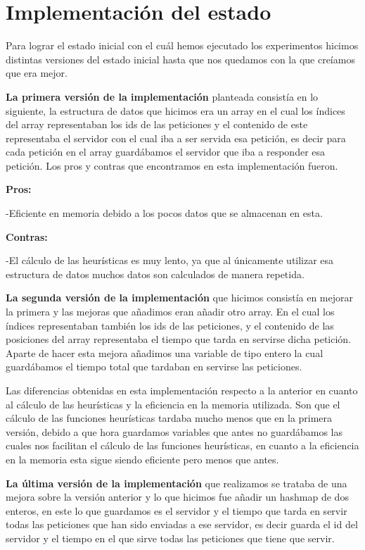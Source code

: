 \section{Implementación del estado}
Para lograr el estado inicial con el cuál hemos ejecutado los experimentos hicimos distintas versiones del estado inicial hasta que nos quedamos con la que creíamos que era mejor.

\textbf{La primera  versión de la implementación} planteada consistía en lo siguiente, la estructura de datos que hicimos era un array en el cual los índices del array representaban los ids de las peticiones y el contenido de este representaba el servidor con el cual iba a ser servida esa petición, es decir para cada petición en el array guardábamos el servidor que iba a responder esa petición. Los pros y contras que encontramos en esta implementación fueron.

\textbf{Pros:}

-Eficiente en memoria debido a los pocos datos que se almacenan en esta.

\textbf{Contras:}

-El cálculo de las heurísticas es muy lento, ya que al únicamente utilizar esa estructura de datos muchos datos son calculados de manera repetida.

\textbf{La segunda versión de la implementación} que hicimos consistía en mejorar la primera y las mejoras que añadimos eran añadir otro array. En el cual los índices representaban también los ids de las peticiones, y el contenido de las posiciones del array representaba el tiempo que tarda en servirse dicha petición. Aparte de hacer esta mejora añadimos una variable de tipo entero la cual guardábamos el tiempo total que tardaban en servirse las peticiones.

Las diferencias obtenidas en esta implementación respecto a la  anterior en cuanto al cálculo de las heurísticas  y la eficiencia en la memoria utilizada. Son que el cálculo de las funciones heurísticas tardaba mucho menos que en la primera versión, debido a que hora guardamos variables que antes no guardábamos las cuales nos facilitan el cálculo de las funciones heurísticas, en cuanto a la eficiencia en la memoria esta sigue siendo eficiente pero menos que antes.

\textbf{La última versión de la implementación} que realizamos se trataba de una mejora sobre la versión anterior y lo que hicimos fue añadir un hashmap de dos enteros, en este lo que guardamos es el servidor y el tiempo que tarda en servir todas las peticiones que han sido enviadas a ese servidor, es decir guarda el id del servidor y el tiempo en el que sirve todas las peticiones que tiene que servir.

